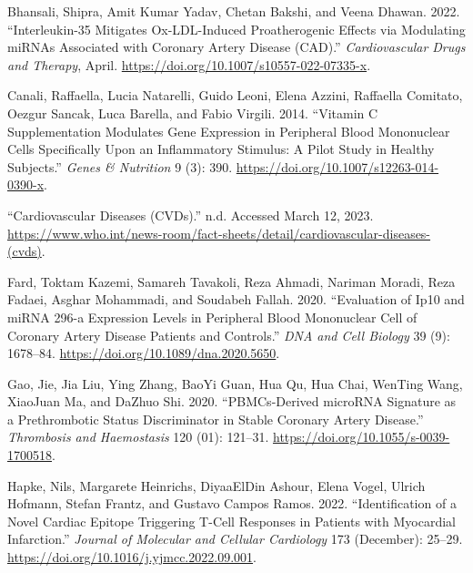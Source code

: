 \documentclass[smallextended]{svjour3}       %
\newlength{\cslhangindent}
\newlength{\cslentryspacingunit} %
\newenvironment{CSLReferences}[2] %
 {%
  \setlength{\parindent}{0pt}
  \ifodd #1
  \let\oldpar\par
  \def\par{\hangindent=\cslhangindent\oldpar}
  \fi
  \setlength{\parskip}{#2\cslentryspacingunit}
 }%
 {}
\begin{document}
\hypertarget{refs}{}
\begin{CSLReferences}{1}{0}
\leavevmode{}%
Bhansali, Shipra, Amit Kumar Yadav, Chetan Bakshi, and Veena Dhawan.
2022. {``Interleukin-35 {Mitigates} Ox-{LDL}-{Induced} {Proatherogenic}
{Effects} via {Modulating} {miRNAs} {Associated} with {Coronary}
{Artery} {Disease} ({CAD}).''} \emph{Cardiovascular Drugs and Therapy},
April. \url{https://doi.org/10.1007/s10557-022-07335-x}.

\leavevmode{}%
Canali, Raffaella, Lucia Natarelli, Guido Leoni, Elena Azzini, Raffaella
Comitato, Oezgur Sancak, Luca Barella, and Fabio Virgili. 2014.
{``Vitamin {C} Supplementation Modulates Gene Expression in Peripheral
Blood Mononuclear Cells Specifically Upon an Inflammatory Stimulus: A
Pilot Study in Healthy Subjects.''} \emph{Genes \& Nutrition} 9 (3):
390. \url{https://doi.org/10.1007/s12263-014-0390-x}.

\leavevmode{}%
{``Cardiovascular Diseases ({CVDs}).''} n.d. Accessed March 12, 2023.
\url{https://www.who.int/news-room/fact-sheets/detail/cardiovascular-diseases-(cvds)}.

\leavevmode{}%
Fard, Toktam Kazemi, Samareh Tavakoli, Reza Ahmadi, Nariman Moradi, Reza
Fadaei, Asghar Mohammadi, and Soudabeh Fallah. 2020. {``Evaluation of
{Ip10} and {miRNA} 296-a {Expression} {Levels} in {Peripheral} {Blood}
{Mononuclear} {Cell} of {Coronary} {Artery} {Disease} {Patients} and
{Controls}.''} \emph{DNA and Cell Biology} 39 (9): 1678--84.
\url{https://doi.org/10.1089/dna.2020.5650}.

\leavevmode{}%
Gao, Jie, Jia Liu, Ying Zhang, BaoYi Guan, Hua Qu, Hua Chai, WenTing
Wang, XiaoJuan Ma, and DaZhuo Shi. 2020. {``{PBMCs}-{Derived} {microRNA}
{Signature} as a {Prethrombotic} {Status} {Discriminator} in {Stable}
{Coronary} {Artery} {Disease}.''} \emph{Thrombosis and Haemostasis} 120
(01): 121--31. \url{https://doi.org/10.1055/s-0039-1700518}.

\leavevmode{}%
Hapke, Nils, Margarete Heinrichs, DiyaaElDin Ashour, Elena Vogel, Ulrich
Hofmann, Stefan Frantz, and Gustavo Campos Ramos. 2022.
{``Identification of a Novel Cardiac Epitope Triggering {T}-Cell
Responses in Patients with Myocardial Infarction.''} \emph{Journal of
Molecular and Cellular Cardiology} 173 (December): 25--29.
\url{https://doi.org/10.1016/j.yjmcc.2022.09.001}.


\end{CSLReferences}
\end{document}

